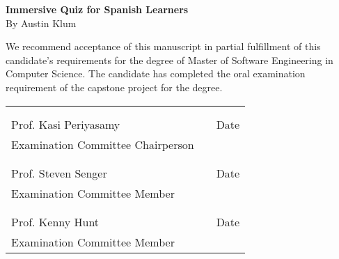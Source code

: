 \thispagestyle{empty}
\vspace*{0.3in}
\begin{center}
	\large{\textbf{Immersive Quiz for Spanish Learners}} \\ 
	\vspace{0.75in}
	\normalsize{By Austin Klum}
\end{center}

\vspace{0.5in}
\noindent We recommend acceptance of this manuscript in partial fulfillment of this candidate's requirements for the degree of Master of Software Engineering in Computer Science. The candidate has completed the oral examination requirement of the capstone project for the degree. \\

\noindent
\begin{tabularx}{\textwidth}{p{3in}Xp{2in}}
	\rule{0pt}{50pt} & & \\
	\hrulefill & & \hrulefill \\
	Prof. Kasi Periyasamy & & Date \\
	Examination Committee Chairperson & & \\
	\rule{0pt}{50pt} & & \\
	\hrulefill & & \hrulefill \\
	Prof. Steven Senger & & Date \\
	Examination Committee Member & & \\
	\rule{0pt}{50pt} & & \\
	\hrulefill & & \hrulefill \\
	Prof. Kenny Hunt & & Date \\
	Examination Committee Member & & \\
\end{tabularx}

